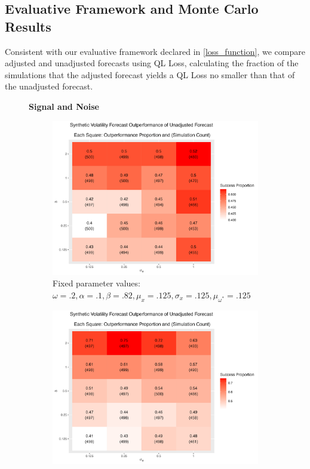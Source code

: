 \documentclass[11pt,3p,review,authoryear]{elsarticle}
\theoremstyle{definition}
\begin{document}
\subsection{Evaluative Framework and Monte Carlo Results}
Consistent with our evaluative framework declared in \ref{loss_function}, we compare adjusted and unadjusted forecasts using QL Loss, calculating the fraction of the simulations that the adjusted forecast yields a QL Loss no smaller than that of the unadjusted forecast.

    \begin{figure}[!h]
      \centering
      \textbf{Signal and Noise}\par\medskip
    \begin{subfigure}{.44\linewidth} 
      \centering
        \includegraphics[scale = .42]{simulation_plots/Jun06_233740_2024_delta_sigma[u].png}
        \caption{Fixed parameter values: $\omega = .2, \alpha = .1, \beta = .82, \mu_{x} = .125, \sigma_{x} = .125, \mu_{\omega^{*}} = .125$}\label{fig:sim_1}
    \end{subfigure}\hspace{12mm} %
    \begin{subfigure}{.44\linewidth} 
      \centering
        \includegraphics[scale=.42]{simulation_plots/Jun06_233900_2024_delta_sigma[u].png}

\end{subfigure}
\end{figure}
\end{document}
